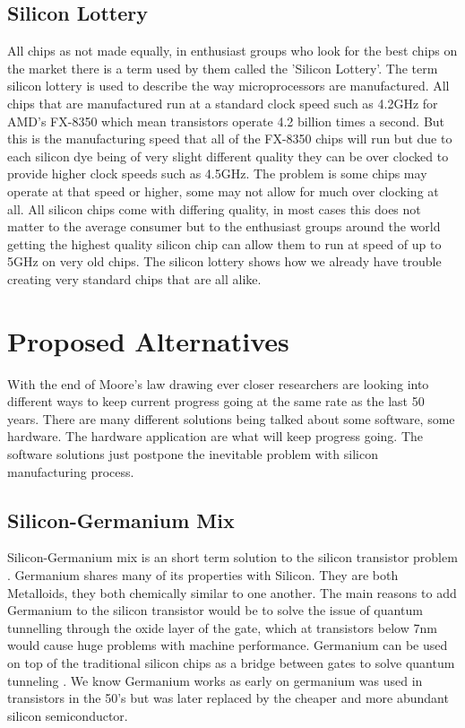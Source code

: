 \documentclass[journal]{IEEEtran}
\begin{document}
\subsection{Silicon Lottery}
All chips as not made equally, in enthusiast groups who look for the best chips on the market there is a term used by them called the 'Silicon Lottery'. The term silicon lottery is used to describe the way microprocessors are manufactured. All chips that are manufactured run at a standard clock speed such as 4.2GHz for AMD's FX-8350 which mean transistors operate 4.2 billion times a second. But this is the manufacturing speed that all of the FX-8350 chips will run but due to each silicon dye being of very slight different quality they can be over clocked to provide higher clock speeds such as 4.5GHz. The problem is some chips may operate at that speed or higher, some may not allow for much over clocking at all. All silicon chips come with differing quality, in most cases this does not matter to the average consumer but to the enthusiast groups around the world getting the highest quality silicon chip can allow them to run at speed of up to 5GHz on very old chips. The silicon lottery shows how we already have trouble creating very standard chips that are all alike.

\section{Proposed Alternatives}
With the end of Moore's law drawing ever closer researchers are looking into different ways to keep current progress going at the same rate as the last 50 years. There are many different solutions being talked about some software, some hardware. The hardware application are what will keep progress going. The software solutions just postpone the inevitable problem with silicon manufacturing process.

\subsection{Silicon-Germanium Mix}
Silicon-Germanium mix is an short term solution to the silicon transistor problem \cite{8947469320180101}. Germanium shares many of its properties with Silicon. They are both Metalloids, they both chemically similar to one another. The main reasons to add Germanium to the silicon transistor would be to solve the issue of quantum tunnelling through the oxide layer of the gate, which at transistors below 7nm would cause huge problems with machine performance. Germanium can be used on top of the traditional silicon chips as a bridge between gates to solve quantum tunneling \cite{ye_2016}. We know Germanium works as early on germanium was used in transistors in the 50's but was later replaced by the cheaper and more abundant silicon semiconductor. 
\end{document}

